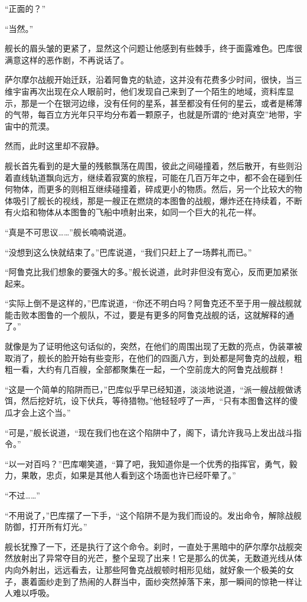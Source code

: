 “正面的？” 

“当然。” 

舰长的眉头皱的更紧了，显然这个问题让他感到有些棘手，终于面露难色。巴库很满意这样的恶作剧，不再说话了。 

萨尔摩尔战舰开始迁跃，沿着阿鲁克的轨迹，这并没有花费多少时间，很快，当三维宇宙再次出现在众人眼前时，他们发现自己来到了一个陌生的地域，资料库显示，那是一个在银河边缘，没有任何的星系，甚至都没有任何的星云，或者是稀薄的气带，每百立方光年只平均分布着一颗原子，也就是所谓的“绝对真空”地带，宇宙中的荒漠。 

然而，此时这里却不寂静。 

舰长首先看到的是大量的残骸飘荡在周围，彼此之间碰撞着，然后散开，有些则沿着直线轨道飘向远方，继续着寂寞的旅程，可能在几百万年之中，都不会在碰到任何物体，而更多的则相互继续碰撞着，碎成更小的物质。然后，另一个比较大的物体吸引了舰长的视线，那是一艘正在燃烧的本图鲁的战舰，爆炸还在持续着，不断有火焰和物体从本图鲁的飞船中喷射出来，如同一个巨大的礼花一样。 

“真是不可思议……”舰长喃喃说道。 

“没想到这么快就结束了。”巴库说道，“我们只赶上了一场葬礼而已。” 

“阿鲁克比我们想象的要强大的多。”舰长说道，此时非但没有宽心，反而更加紧张起来。 

“实际上倒不是这样的，”巴库说道，“你还不明白吗？阿鲁克还不至于用一艘战舰就能击败本图鲁的一个舰队，不过，要是有更多的阿鲁克战舰的话，这就解释的通了。” 

就像是为了证明他这句话似的，突然，在他们的周围出现了无数的亮点，伪装罩被取消了，舰长的脸开始有些变形，在他们的四面八方，到处都是阿鲁克的战舰，粗粗一看，大约有几百艘，全部都聚集在一起，一个空前庞大的阿鲁克战舰群！ 

“这是一个简单的陷阱而已，”巴库似乎早已经知道，淡淡地说道，“派一艘战舰做诱饵，然后挖好坑，设下伏兵，等待猎物。”他轻轻哼了一声，“只有本图鲁这样的傻瓜才会上这个当。” 

“可是，”舰长说道，“现在我们也在这个陷阱中了，阁下，请允许我马上发出战斗指令。” 

“以一对百吗？”巴库嘲笑道，“算了吧，我知道你是一个优秀的指挥官，勇气，毅力，果敢，忠贞，如果是其他人看到这个场面也许已经吓晕了。” 

“不过……” 

“不用说了，”巴库摆了一下手，“这个陷阱不是为我们而设的。发出命令，解除战舰防御，打开所有灯光。” 

舰长犹豫了一下，还是执行了这个命令。刹时，一直处于黑暗中的萨尔摩尔战舰突然放射出了异常夺目的光芒，整个呈现了出来！它是那么的优美，无数道光线从体内向外射出，远远看去，让那些阿鲁克战舰顿时相形见绌，就好象一个极美的女子，裹着面纱走到了热闹的人群当中，面纱突然掉落下来，那一瞬间的惊艳一样让人难以呼吸。 

